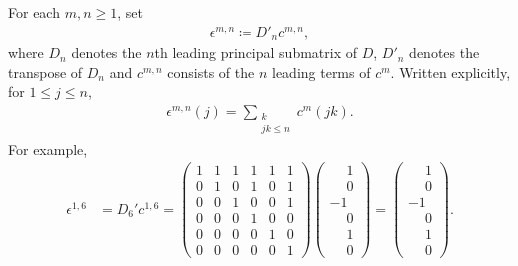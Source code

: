 \documentclass[12pt,reqno]{article}
\begin{document}
For each $m,n\geq 1$, set
\begin{align*}
\epsilon^{m,n}\coloneqq D'_nc^{m,n},
\end{align*}
where $D_n$ denotes the $n$th leading principal submatrix of $D$, $D'_n$ denotes the transpose of $D_n$ and $c^{m,n}$ consists of the 
$n$ leading terms of $c^{m}$.  
Written explicitly, for $1\leq j\leq n$,
\begin{align}
\epsilon^{m,n}(j) = \sum_{\substack{k\\jk\leq n}} c^{m}(jk).
\label{eqn:defcm}
\end{align}
For example, 
\begin{align*}
\epsilon^{1,6} &= 
D_{6}' c^{1,6}=
\begin{pmatrix}
 1& 1& 1& 1& 1& 1\\
 0& 1& 0& 1& 0& 1\\
 0& 0& 1& 0& 0& 1\\
 0& 0& 0& 1& 0& 0\\
 0& 0& 0& 0& 1& 0\\
 0& 0& 0& 0& 0& 1
\end{pmatrix}
\begin{pmatrix}
\phantom{-}  1 \\
\phantom{-}  0 \\
            -1 \\
\phantom{-}  0 \\
\phantom{-}  1 \\
\phantom{-}  0
\end{pmatrix}
= \begin{pmatrix}
\phantom{-}  1\\
\phantom{-}  0\\
            -1\\
\phantom{-}  0\\
\phantom{-}  1\\
\phantom{-}  0
\end{pmatrix}.
\end{align*}
\end{document}
